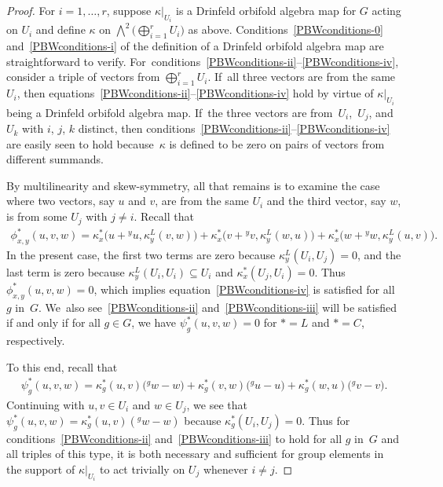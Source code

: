 \documentclass[10pt,a4paper]{amsart}
\numberwithin{equation}{section}
\newcommand{\actby}[1]{{}^{#1}}
\begin{document}
\begin{proof}
 For $i=1,\ldots,r$, suppose $\kappa|_{U_i}$ is a Drinfeld orbifold algebra map for $G$ acting on $U_i$ and define $\kappa$ on $\bigwedge^2\big(\bigoplus_{i=1}^r U_i\big)$ as above.
 Conditions~\eqref{PBWconditions-0} and~\eqref{PBWconditions-i} of the definition of a Drinfeld orbifold algebra map are straightforward to verify. For~conditions~\eqref{PBWconditions-ii}--\eqref{PBWconditions-iv}, consider a triple of vectors from $\bigoplus_{i=1}^r U_i$. If~all three vectors are from the same $U_i$, then equations~\eqref{PBWconditions-ii}--\eqref{PBWconditions-iv} hold by virtue of $\kappa|_{U_i}$ being a Drinfeld orbifold algebra map. If~the three vectors are from~$U_i$,~$U_j$, and~$U_k$ with $i$, $j$, $k$ distinct, then conditions~\eqref{PBWconditions-ii}--\eqref{PBWconditions-iv} are easily seen to hold because~$\kappa$ is defined to be zero on pairs of vectors from different summands.

 By multilinearity and skew-symmetry, all that remains is to examine the case where two vectors, say $u$ and $v$, are from the same $U_i$ and the third vector, say $w$, is from some $U_j$ with $j\neq i$. Recall that
 \begin{gather*}
 \phi_{x,y}^*(u,v,w)=\kappa_x^*\big(u+\actby{y}u,\kappa_y^L(v,w)\big) +\kappa_x^*\big(v+\actby{y}v,\kappa_y^L(w,u)\big)+\kappa_x^*\big(w+\actby{y}w,\kappa_y^L(u,v)\big).
 \end{gather*}
 In the present case, the first two terms are zero because $\kappa^L_y(U_i,U_j)=0$, and the last term is zero because $\kappa_y^L(U_i,U_i)\subseteq U_i$ and $\kappa^*_x(U_j,U_i)=0$. Thus $\phi_{x,y}^*(u,v,w)=0$, which implies equation~\eqref{PBWconditions-iv} is satisfied for all $g$ in~$G$. We~also see~\eqref{PBWconditions-ii} and~\eqref{PBWconditions-iii} will be satisfied if and only if for all $g\in G$, we have $\psi_g^*(u,v,w)=0$ for $*=L$ and $*=C$, respectively.

 To this end, recall that
 \begin{gather*}
 \psi_g^*(u,v,w)=\kappa_g^*(u,v)\big(\actby{g}w-w\big)+\kappa_g^*(v,w)\big(\actby{g}u-u\big)+ \kappa_g^*(w,u)\big(\actby{g}v-v\big).
 \end{gather*}
 Continuing with $u,v\in U_i$ and $w\in U_j$, we see that $\psi_g^*(u,v,w)=\kappa_g^*(u,v)(\actby{g}w-w)$ because $\kappa_g^*(U_i,U_j)=0$.
 Thus for conditions~\eqref{PBWconditions-ii} and~\eqref{PBWconditions-iii} to hold for all $g$ in~$G$ and all triples of this type, it is both necessary and sufficient for group elements in the support of $\kappa|_{U_i}$ to act trivially on $U_j$ whenever $i\neq j$.
\end{proof}
\end{document}
